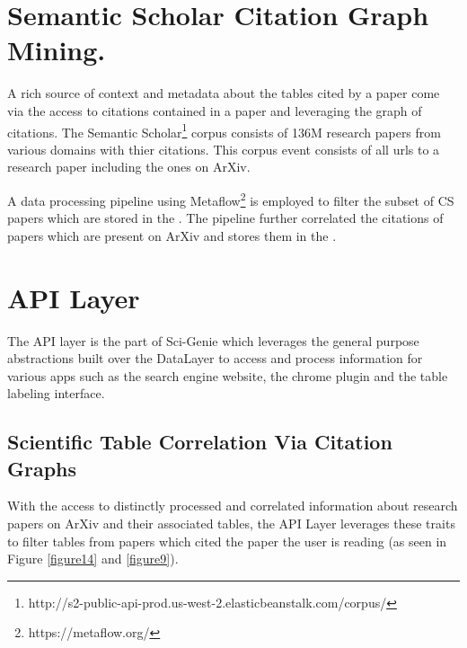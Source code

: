 \section{Semantic Scholar Citation Graph Mining.}
\label{sci-genie-core:citation-mining}
A rich source of context and metadata about the tables cited by a paper come via the access to citations contained in a paper and leveraging the graph of citations. The Semantic Scholar\footnote{http://s2-public-api-prod.us-west-2.elasticbeanstalk.com/corpus/} corpus consists of 136M research papers from various domains with thier citations. This corpus event consists of all urls to a research paper including the ones on ArXiv.  

A data processing pipeline using Metaflow\footnote{https://metaflow.org/} is employed to filter the subset of CS papers which are stored in the . The pipeline further  correlated the citations of papers which are present on ArXiv and stores them in the . 

\section{API Layer}
The API layer is the part of Sci-Genie which leverages the general purpose abstractions built over the DataLayer to access and process information for various apps such as the search engine website, the chrome plugin and the table labeling interface. 

\subsection{Scientific Table Correlation Via Citation Graphs}
With the access to distinctly processed and correlated information about research papers on ArXiv and their associated tables, the API Layer leverages these traits to filter tables from papers which cited the paper the user is reading (as seen in Figure \ref{figure14} and \ref{figure9}). 


